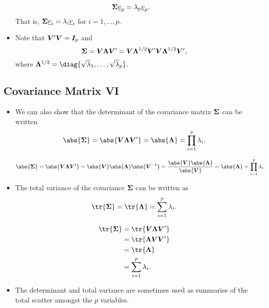 \begin{itemize}
\begin{framed}
\begin{align*}
                        \bm{\Sigma}\underline{v}_p & =\lambda_p \underline{v}_p.
                  \end{align*}
                  That is, $ \bm{\Sigma}\underline{v}_i=\lambda_i \underline{v}_i $ for $ i=1,\ldots,p $.
            \end{framed}
      \item Note that $ \bm{V}'\bm{V}=\bm{I}_p $ and
            \[ \bm{\Sigma}=\bm{V}\bm{\Lambda}\bm{V}'=\bm{V}\bm{\Lambda}^{1/2}\bm{V}'\bm{V}\bm{\Lambda}^{1/2}\bm{V}', \]
            where $ \Matrix{\Lambda}^{1/2}=\diag{\sqrt{\lambda}_1,\ldots,\sqrt{\lambda}_p} $.
\end{itemize}
\subsection*{Covariance Matrix VI}
\begin{itemize}
      \item We can also show that the determinant of the covariance matrix $ \bm{\Sigma} $ can be written
            \[ \abs{\Matrix{\Sigma}}=\abs{\Matrix{V}\Matrix{\Lambda}\Matrix{V}'}=\abs{\Matrix{\Lambda}}=\prod_{i=1}^p \lambda_i. \]
            \begin{framed}
                  \[ \abs{\Matrix{\Sigma}}=\abs{\Matrix{V}\Matrix{\Lambda}\Matrix{V}'}=\abs{\Matrix{V}}\abs{\Matrix{\Lambda}}\abs{\Matrix{V}^{-1}}=\frac{\abs{\Matrix{V}}\abs{\Matrix{\Lambda}}}{\abs{\Matrix{V}}}
                        =\abs{\Matrix{\Lambda}}=\prod_{i=1}^p \lambda_i. \]
            \end{framed}
      \item The total variance of the covariance $ \bm{\Sigma} $ can be written as
            \[ \tr{\Matrix{\Sigma}}=\tr{\Matrix{\Lambda}}=\sum_{i=1}^{p}\lambda_i. \]
            \begin{framed}
                  \begin{align*}
                        \tr{\Matrix{\Sigma}}
                         & =\tr{\Matrix{V}\Matrix{\Lambda}\Matrix{V}'} \\
                         & =\tr{\Matrix{\Lambda}\Matrix{V}\Matrix{V}'} \\
                         & =\tr{\Matrix{\Lambda}}                      \\
                         & =\sum_{i=1}^{p}\lambda_i.
                  \end{align*}
            \end{framed}
      \item The determinant and total variance are sometimes used as summaries of the total scatter amongst the $ p $ variables.
\end{itemize}
